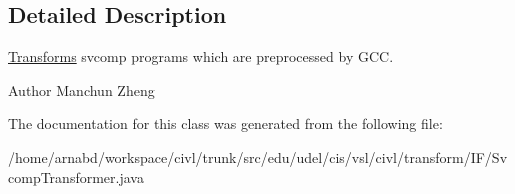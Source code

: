 \subsection{Detailed Description}
\hyperlink{classedu_1_1udel_1_1cis_1_1vsl_1_1civl_1_1transform_1_1IF_1_1Transforms}{Transforms} svcomp programs which are preprocessed by G\+C\+C. 

\begin{DoxyAuthor}{Author}
Manchun Zheng 
\end{DoxyAuthor}


The documentation for this class was generated from the following file\+:\begin{DoxyCompactItemize}
\item 
/home/arnabd/workspace/civl/trunk/src/edu/udel/cis/vsl/civl/transform/\+I\+F/Svcomp\+Transformer.\+java\end{DoxyCompactItemize}
